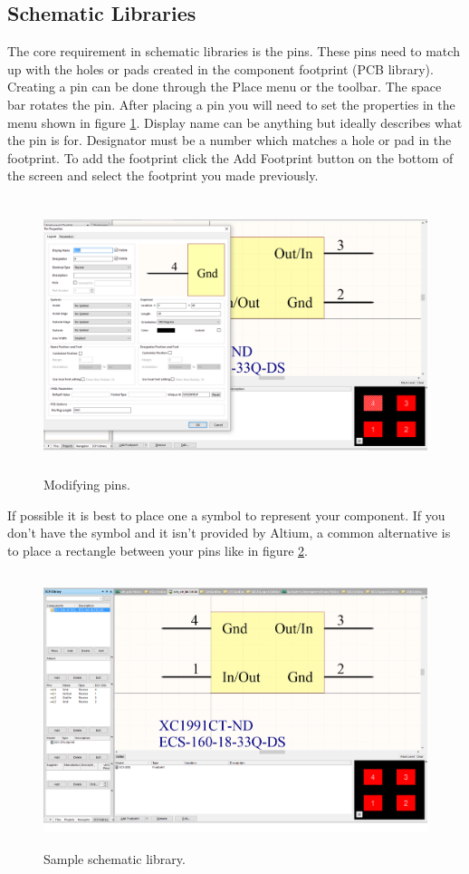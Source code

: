 \documentclass{report}
\begin{document}
	\subsection{Schematic Libraries}
	The core requirement in schematic libraries is the pins. These pins need to match up with the holes or pads created in the component footprint (PCB library). Creating a pin can be done through the Place menu or the toolbar. The space bar rotates the pin. After placing a pin you will need to set the properties in the menu shown in figure \ref{pin_creation}. Display name can be anything but ideally describes what the pin is for. Designator must be a number which matches a hole or pad in the footprint. To add the footprint click the Add Footprint button on the bottom of the screen and select the footprint you made previously.
	\begin{figure}[H]	
		\centering
		\includegraphics[width=16cm, height=8cm]{pics/pin_creation.png}
		\caption{Modifying pins.}
		\label{pin_creation}
	\end{figure}
	If possible it is best to place one a symbol to represent your component. If you don't have the symbol and it isn't provided by Altium, a common alternative is to place a rectangle between your pins like in figure \ref{schem_lib}.
	\begin{figure}[H]	
		\centering
		\includegraphics[width=16cm, height=8cm]{pics/schem_lib1.png}
		\caption{Sample schematic library.}
		\label{schem_lib}
	\end{figure}
\end{document}
